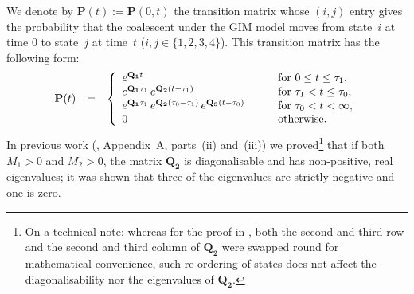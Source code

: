 \documentclass[11pt]{article}
\begin{document}
We denote by $\mathbf{P}(t):=\mathbf{P}(0,t)$ the transition matrix whose $(i,j)$ entry gives the probability that the coalescent under the GIM model moves from state~$i$ at time $0$ to state~$j$ at time~$t$ ($i,j \in \{1,2,3,4\}$). This transition matrix has the following form:
\begin{equation}
\label{eq:tran_prob_matrix}
\begin{array}{lcl}
\mathbf{P}(t) &=& \left\{
  \begin{array}{l l}
    e^{\mathbf{Q_{1}}t}\quad& \quad \text{for } 0 \leq t \leq \tau_{1},\\
   e^{\mathbf{Q_{1}}\tau_{1}}\, e^{\mathbf{Q_{2}}\left(t-\tau_{1}\right)} \quad  & \quad \text{for } \tau_{1} < t \leq \tau_{0},\\
   e^{\mathbf{Q_{1}}\tau_{1}}\, e^{\mathbf{Q_{2}}\left(\tau_{0}-\tau_{1}\right)}\,e^{\mathbf{Q_{3}}\left(t-\tau_{0}\right)}\quad & \quad \text{for }\tau_{0} < t< \infty,\\
0\quad &\quad \text{otherwise}.
  \end{array} \right.\\
  \end{array}
\end{equation}
In previous work (\citealp{Costa2017}, Appendix~A, parts~(ii) and~(iii)) we proved\footnote{On a technical note: whereas for the proof in \citet{Costa2017}, both the second and third row and the second and third column of $\mathbf{Q_{2}}$ were swapped round for mathematical convenience, such re-ordering of states does not affect the diagonalisability nor the eigenvalues of 
$\mathbf{Q_{2}}$.} that if both $M_1>0$ and $M_2>0$, the matrix $\mathbf{Q_{2}}$ is diagonalisable and has non-positive, real eigenvalues; it was shown that three of the eigenvalues are strictly negative and one is zero.
\end{document}
